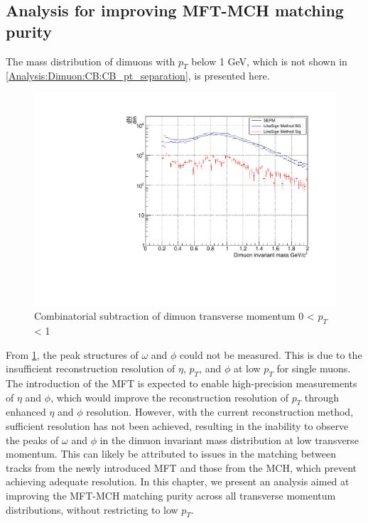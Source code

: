     \subsection{Analysis for improving MFT-MCH matching purity}
        The mass distribution of dimuons with \( p_T \) below 1 GeV, which is not shown in \ref{Analysis:Dimuon:CB:CB_pt_separation}, is presented here.
        \begin{figure}
            \centering
            \includegraphics[keepaspectratio, scale=0.4]{fig/3_6_CB_pt0to1.pdf}
            \caption{Combinatorial subtraction of dimuon transverse momentum 0 < $p_T$ < 1}
            \label{Analysis:Dimuon:pt0to1}
        \end{figure}
        From \ref{Analysis:Dimuon:pt0to1}, the peak structures of \(\omega\) and \(\phi\) could not be measured. This is due to the insufficient reconstruction resolution of \(\eta\), \(p_T\), and \(\phi\) at low \(p_T\) for single muons. The introduction of the MFT is expected to enable high-precision measurements of \(\eta\) and \(\phi\), which would improve the reconstruction resolution of \(p_T\) through enhanced \(\eta\) and \(\phi\) resolution. However, with the current reconstruction method, sufficient resolution has not been achieved, resulting in the inability to observe the peaks of \(\omega\) and \(\phi\) in the dimuon invariant mass distribution at low transverse momentum. This can likely be attributed to issues in the matching between tracks from the newly introduced MFT and those from the MCH, which prevent achieving adequate resolution. In this chapter, we present an analysis aimed at improving the MFT-MCH matching purity across all transverse momentum distributions, without restricting to low \(p_T\).

